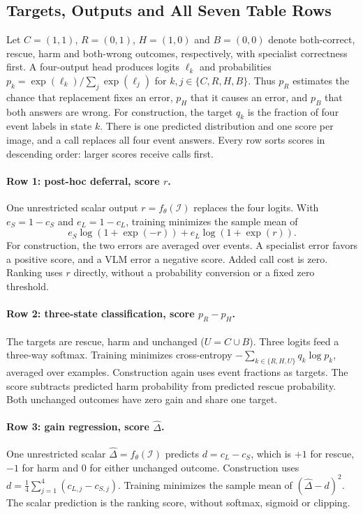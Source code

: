 \subsection{Targets, Outputs and All Seven Table Rows}
Let $C=(1,1)$, $R=(0,1)$, $H=(1,0)$ and $B=(0,0)$ denote both-correct, rescue, harm and both-wrong outcomes, respectively, with specialist correctness first. A four-output head produces logits $\ell_k$ and probabilities $p_k=\exp(\ell_k)/\sum_j\exp(\ell_j)$ for $k,j\in\{C,R,H,B\}$. Thus $p_R$ estimates the chance that replacement fixes an error, $p_H$ that it causes an error, and $p_B$ that both answers are wrong. For construction, the target $q_k$ is the fraction of four event labels in state $k$. There is one predicted distribution and one score per image, and a call replaces all four event answers. Every row sorts scores in descending order: larger scores receive calls first.

\paragraph{Row 1: post-hoc deferral, score $r$.}
One unrestricted scalar output $r=f_\theta(\mathcal I)$ replaces the four logits. With $e_S=1-c_S$ and $e_L=1-c_L$, training minimizes the sample mean of
\[
e_S\log(1+\exp(-r))+e_L\log(1+\exp(r)).
\]
For construction, the two errors are averaged over events. A specialist error favors a positive score, and a VLM error a negative score. Added call cost is zero. Ranking uses $r$ directly, without a probability conversion or a fixed zero threshold.

\paragraph{Row 2: three-state classification, score $p_R-p_H$.}
The targets are rescue, harm and unchanged ($U=C\cup B$). Three logits feed a three-way softmax. Training minimizes cross-entropy $-\sum_{k\in\{R,H,U\}}q_k\log p_k$, averaged over examples. Construction again uses event fractions as targets. The score subtracts predicted harm probability from predicted rescue probability. Both unchanged outcomes have zero gain and share one target.

\paragraph{Row 3: gain regression, score $\widehat\Delta$.}
One unrestricted scalar $\widehat\Delta=f_\theta(\mathcal I)$ predicts $d=c_L-c_S$, which is $+1$ for rescue, $-1$ for harm and $0$ for either unchanged outcome. Construction uses $d=\tfrac14\sum_{j=1}^{4}(c_{L,j}-c_{S,j})$. Training minimizes the sample mean of $(\widehat\Delta-d)^2$. The scalar prediction is the ranking score, without softmax, sigmoid or clipping.

